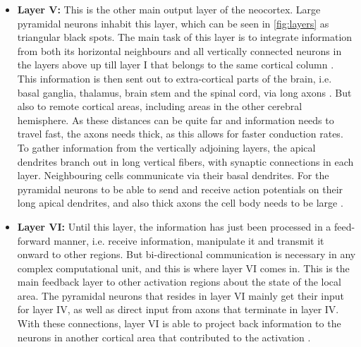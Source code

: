 \begin{itemize}[leftmargin=4em,align=left]
    
    \item\textbf{Layer V:} This is the other main output layer of the neocortex. Large pyramidal neurons inhabit this layer, which can be seen in \autoref{fig:layers} as triangular black spots. The main task of this layer is to integrate information from both its horizontal neighbours and all vertically connected neurons in the layers above up till layer I that belongs to the same cortical column \cite{Neocortex}. This information is then sent out to extra-cortical parts of the brain, i.e. basal ganglia, thalamus, brain stem and the spinal cord, via long axons \cite{crossman2014neuroanatomy}. But also to remote cortical areas, including areas in the other cerebral hemisphere. As these distances can be quite far and information needs to travel fast, the axons needs thick, as this allows for faster conduction rates. To gather information from the vertically adjoining layers, the apical dendrites branch out in long vertical fibers, with synaptic connections in each layer. Neighbouring cells communicate via their basal dendrites. For the pyramidal neurons to be able to send and receive action potentials on their long apical dendrites, and also thick axons the cell body needs to be large \cite{Neocortex}.
    
    
    \item\textbf{Layer VI:} Until this layer, the information has just been processed in a feed-forward manner, i.e. receive information, manipulate it and transmit it onward to other regions. But bi-directional communication is necessary in any complex computational unit, and this is where layer VI comes in. This is the main feedback layer to other activation regions about the state of the local area. The pyramidal neurons that resides in layer VI mainly get their input for layer IV, as well as direct input from axons that terminate in layer IV. With these connections, layer VI is able to project back information to the neurons in another cortical area that contributed to the activation \cite{Neocortex}. 
    
    
\end{itemize}

